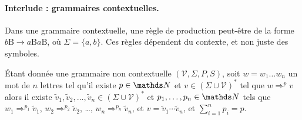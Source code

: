 \paragraph{Interlude : grammaires contextuelles.}
Dans une grammaire contextuelle, une règle de production peut-être de la forme $b \mathrm{B} \to a \mathrm{B} a \mathrm{B}$, où $\Sigma = \{a,b\}$.
Ces règles dépendent du contexte, et non juste des symboles.

\bigskip

\begin{lem}[de décomposition]
	Étant donnée une grammaire non contextuelle $(\mathcal{V}, \Sigma, P, S)$, soit $w = w_1\ldots w_n$ un mot de $n$ lettres tel qu'il existe $p \in \N$ et $v \in (\Sigma \cup \mathcal{V})^*$ tel que $w \Rightarrow^p v$ alors il existe $\tilde{v}_1, \tilde{v}_2, \ldots, \tilde{v}_n \in (\Sigma \cup \mathcal{V})^*$ et $p_1, \ldots, p_n \in \N$ tels que $w_1 \Rightarrow^{p_1}  \tilde{v}_1$, $w_2 \Rightarrow^{p_2} \tilde{v}_2$, \ldots, $w_n \Rightarrow^{p_n} \tilde{v}_n$, et $v = \tilde{v}_1 \cdots \tilde{v}_n$, et $\sum_{i=1}^n p_i = p$.
\end{lem}

\bigskip

